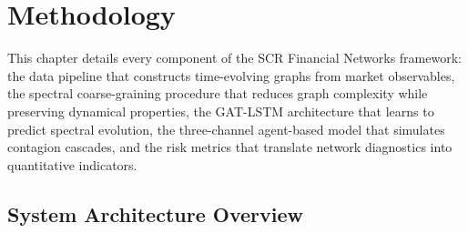 \chapter{Methodology}
\label{ch:methodology}

This chapter details every component of the SCR Financial Networks framework: the data pipeline that constructs time-evolving graphs from market observables, the spectral coarse-graining procedure that reduces graph complexity while preserving dynamical properties, the GAT-LSTM architecture that learns to predict spectral evolution, the three-channel agent-based model that simulates contagion cascades, and the risk metrics that translate network diagnostics into quantitative indicators.


\section{System Architecture Overview}
\label{sec:architecture}

